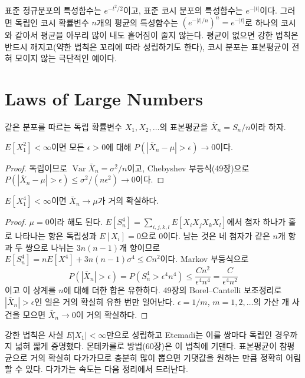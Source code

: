 표준 정규분포의 특성함수는 $e^{-t^2/2}$이고, 표준 코시 분포의 특성함수는 $e^{-|t|}$이다. 그러면 독립인 코시 확률변수 $n$개의 평균의 특성함수는 $(e^{-|t|/n})^n=e^{-|t|}$로 하나의 코시와 같아서 평균을 아무리 많이 내도 흩어짐이 줄지 않는다. 평균이 없으면 강한 법칙은 반드시 깨지고(약한 법칙은 꼬리에 따라 성립하기도 한다), 코시 분포는 표본평균이 전혀 모이지 않는 극단적인 예이다.

\section{Laws of Large Numbers}
\label{sec:lln}

같은 분포를 따르는 독립 확률변수 $X_1,X_2,\dots$의 표본평균을 $\bar X_n=S_n/n$이라 하자.

\begin{theorem}[약한 법칙]
$E[X_1^2]<\infty$이면 모든 $\epsilon>0$에 대해 $P(|\bar X_n-\mu|>\epsilon)\to0$이다.
\end{theorem}

\begin{proof}
독립이므로 $\operatorname{Var}\bar X_n=\sigma^2/n$이고, Chebyshev 부등식(49장)으로 $P(|\bar X_n-\mu|>\epsilon)\le\sigma^2/(n\epsilon^2)\to0$이다.
\end{proof}

\begin{theorem}[강한 법칙, 4차 모멘트]
\label{thm:slln4}
$E[X_1^4]<\infty$이면 $\bar X_n\to\mu$가 거의 확실하다.
\end{theorem}

\begin{proof}
$\mu=0$이라 해도 된다. $E[S_n^4]=\sum_{i,j,k,l}E[X_iX_jX_kX_l]$에서 첨자 하나가 홀로 나타나는 항은 독립성과 $E[X_i]=0$으로 $0$이다. 남는 것은 네 첨자가 같은 $n$개 항과 두 쌍으로 나뉘는 $3n(n-1)$개 항이므로 $E[S_n^4]=nE[X^4]+3n(n-1)\sigma^4\le Cn^2$이다. Markov 부등식으로
\[
P(|\bar X_n|>\epsilon)=P(S_n^4>\epsilon^4n^4)\le\frac{Cn^2}{\epsilon^4n^4}=\frac C{\epsilon^4n^2}
\]
이고 이 상계를 $n$에 대해 더한 합은 유한하다. 49장의 Borel--Cantelli 보조정리로 $|\bar X_n|>\epsilon$인 일은 거의 확실히 유한 번만 일어난다. $\epsilon=1/m$, $m=1,2,\dots$의 가산 개 사건을 모으면 $\bar X_n\to0$이 거의 확실하다.
\end{proof}

강한 법칙은 사실 $E|X_1|<\infty$만으로 성립하고 Etemadi는 이를 쌍마다 독립인 경우까지 넓혀 짧게 증명했다\cite{etemadi1981}. 몬테카를로 방법(60장)은 이 법칙에 기댄다. 표본평균이 참평균으로 거의 확실히 다가가므로 충분히 많이 뽑으면 기댓값을 원하는 만큼 정확히 어림할 수 있다. 다가가는 속도는 다음 정리에서 드러난다.

